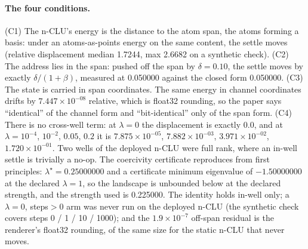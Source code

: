 \documentclass{article} %
\newcommand{\sci}[2]{\ensuremath{#1\times10^{#2}}}
\begin{document}
\paragraph{The four conditions.} (C1) The n-CLU's energy is the distance to the atom span, the
atoms forming a basis: under an atoms-as-points energy on the same content, the settle moves
(relative displacement median 1.7244, max 2.6682 on a synthetic check). (C2) The address lies in
the span: pushed off the span by $\delta=0.10$, the settle moves by exactly $\delta/(1+\beta)$,
measured at 0.050000 against the closed form 0.050000. (C3) The state is carried in span
coordinates. The same energy in channel coordinates drifts by \sci{7.447}{-08} relative, which is
float32 rounding, so the paper says ``identical'' of the channel form and ``bit-identical'' only
of the span form. (C4) There is no cross-well term: at $\lambda=0$ the displacement is exactly 0.0,
and at $\lambda=10^{-4}$, $10^{-2}$, $0.05$, $0.2$ it is \sci{7.875}{-05}, \sci{7.882}{-03},
\sci{3.971}{-02}, \sci{1.720}{-01}. Two wells of the deployed n-CLU were full rank, where an in-well
settle is trivially a no-op. The coercivity certificate reproduces from first principles:
$\lambda^\star=0.25000000$ and a certificate minimum eigenvalue of $-1.50000000$ at the declared
$\lambda=1$, so the landscape is unbounded below at the declared strength, and the strength used is
0.225000. %
The identity holds in-well only; a $\lambda=0$, steps$>0$ arm was never run on the deployed n-CLU
(the synthetic check covers steps 0 / 1 / 10 / 1000); and the \sci{1.9}{-7} off-span residual is the
renderer's float32 rounding, of the same size for the static n-CLU that never moves.
\end{document}

